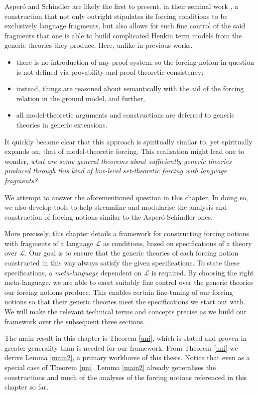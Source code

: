 \documentclass[12pt, twoside]{memoir}
\numberwithin{equation}{section}
\theoremstyle{definition}
\theoremstyle{remark}
\theoremstyle{definition}
\theoremstyle{definition}
\theoremstyle{definition}
\theoremstyle{remark}
\begin{document}
Asper\'{o} and Schindler are likely the first to present, in their seminal work \cite{schindler}, a construction that not only outright stipulates its forcing conditions to be exclusively language fragments, but also allows for such fine control of the said fragments that one is able to build complicated Henkin term models from the generic theories they produce. Here, unlike in previous works, 
\begin{itemize}
    \item there is no introduction of any proof system, so the forcing notion in question is not defined via provability and proof-theoretic consistency;
    \item instead, things are reasoned about semantically with the aid of the forcing relation in the ground model, and further,
    \item all model-theoretic arguments and constructions are deferred to generic theories in generic extensions.
\end{itemize}  
It quickly became clear that this approach is spiritually similar to, yet spiritually expands on, that of model-theoretic forcing. This realisation might lead one to wonder, \textit{what are some general theorems about sufficiently generic theories produced through this kind of low-level set-theoretic forcing with language fragments?}

We attempt to answer the aforementioned question in this chapter. In doing so, we also develop tools to help streamline and modularise the analysis and construction of forcing notions similar to the Asper\'{o}-Schindler ones.

More precisely, this chapter details a framework for constructing forcing notions with fragments of a language $\mathcal{L}$ as conditions, based on specifications of a theory over $\mathcal{L}$. Our goal is to ensure that the generic theories of each forcing notion constructed in this way always satisfy the given specifications. To state these specifications, a \textit{meta-language} dependent on $\mathcal{L}$ is required. By choosing the right meta-language, we are able to exert suitably fine control over the generic theories our forcing notions produce. This enables certain fine-tuning of our forcing notions so that their generic theories meet the specifications we start out with. We will make the relevant technical terms and concepts precise as we build our framework over the subsequent three sections.

The main result in this chapter is Theorem \ref{uni}, which is stated and proven in greater generality than is needed for our framework. From Theorem \ref{uni} we derive Lemma \ref{main2}, a primary workhorse of this thesis. Notice that even as a special case of Theorem \ref{uni}, Lemma \ref{main2} already generalises the constructions and much of the analyses of the forcing notions referenced in this chapter so far.
\end{document}
